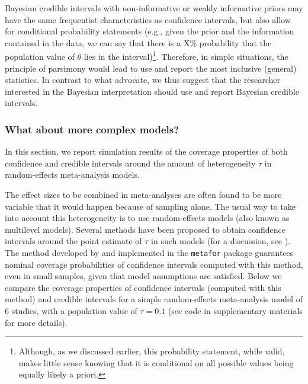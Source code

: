 \documentclass[a4paper,man,natbib,floatsintext,donotrepeattitle]{apa6}
\begin{document}
Bayesian credible intervals with non-informative or weakly informative priors may have the same frequentist characteristics as confidence intervals, but also allow for conditional probability statements (e.g., given the prior and the information contained in the data, we can say that there is a X\% probability that the population value of $\theta$ lies in the interval)\footnote{Although, as we discussed earlier, this probability statement, while valid, makes little sense knowing that it is conditional on all possible values being equally likely a priori.}. Therefore, in simple situations, the principle of parsimony would lead to use and report the most inclusive (general) statistics. In contrast to what \cite{albers_credible_2018} advocate, we thus suggest that the researcher interested in the Bayesian interpretation should use and report Bayesian credible intervals.

\subsubsection{What about more complex models?}

In this section, we report simulation results of the coverage properties of both confidence and credible intervals around the amount of heterogeneity $\tau$ in random-effects meta-analysis models.

The effect sizes to be combined in meta-analyses are often found to be more variable that it would happen because of sampling alone. The usual way to take into account this heterogeneity is to use random-effects models (also known as multilevel models). Several methods have been proposed to obtain confidence intervals around the point estimate of $\tau$ in such models (for a discussion, see \citealp{williams_bayesian_2018}). The method developed by \cite{paule_consensus_1982} and implemented in the \texttt{metafor} package \citep{viechtbauer_conducting_2010} guarantees nominal coverage probabilities of confidence intervals computed with this method, even in small samples, given that model assumptions are satisfied. Below we compare the coverage properties of confidence intervals (computed with this method) and credible intervals for a simple random-effects meta-analysis model of 6 studies, with a population value of $\tau = 0.1$ (see code in supplementary materials for more details).
\end{document}
